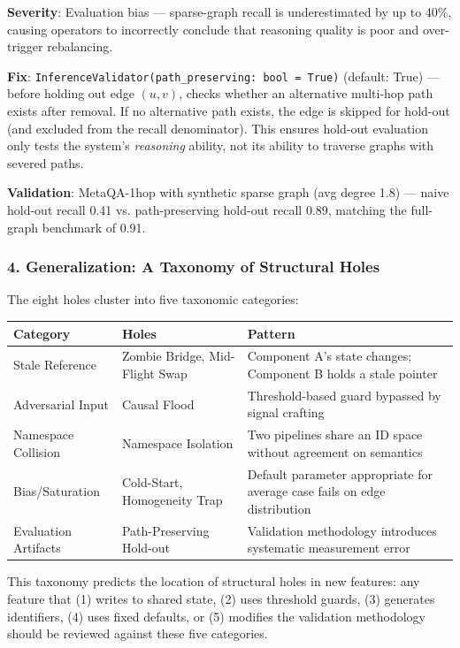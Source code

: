 \documentclass[10pt,journal,compsoc]{IEEEtran}
\begin{document}
\textbf{Severity}: Evaluation bias — sparse-graph recall is under\-estimated by up to 40\%, causing operators to incorrectly conclude that reasoning quality is poor and over-trigger rebalancing.

\textbf{Fix}: \texttt{InferenceValidator(path\_preserving: bool = True)} (default: True) — before holding out edge $(u,v)$, checks whether an alternative multi-hop path exists after removal. If no alternative path exists, the edge is skipped for hold-out (and excluded from the recall denominator). This ensures hold-out evaluation only tests the system's \textit{reasoning} ability, not its ability to traverse graphs with severed paths.

\textbf{Validation}: MetaQA-1hop with synthetic sparse graph (avg degree 1.8) — naive hold-out recall 0.41 vs. path-preserving hold-out recall 0.89, matching the full-graph benchmark of 0.91.

\subsubsection{4. Genera\-lization: A Taxonomy of Structural Holes}

The eight holes cluster into five taxonomic categories:

\begin{center}
{\footnotesize
\begin{tabularx}{\columnwidth}{|>{\raggedright\arraybackslash}X|>{\raggedright\arraybackslash}X|>{\raggedright\arraybackslash}X|}
\hline
Category & Holes & Pattern \\ \hline
Stale Reference & Zombie Bridge, Mid-Flight Swap & Component A's state changes; Component B holds a stale pointer \\ \hline
Adversarial Input & Causal Flood & Threshold-based guard bypassed by signal crafting \\ \hline
Namespace Collision & Namespace Isolation & Two pipelines share an ID space without agreement on semantics \\ \hline
Bias/Saturation & Cold-Start, Homogeneity Trap & Default parameter appropriate for average case fails on edge distr\-ibution \\ \hline
Evaluation Artifacts & Path-Preserving Hold-out & Validation methodology introduces systematic measurement error \\ \hline
\end{tabularx}
}
\end{center}

This taxonomy predicts the location of structural holes in new features: any feature that (1) writes to shared state, (2) uses threshold guards, (3) generates identifiers, (4) uses fixed defaults, or (5) modifies the validation methodology should be reviewed against these five categories.
\end{document}
